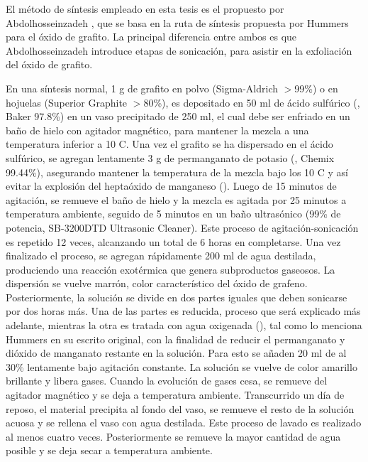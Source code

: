 El método de síntesis empleado en esta tesis es el propuesto por Abdolhosseinzadeh \citep{Abdolhosseinzadeh2015}, que se basa en la ruta de síntesis propuesta por Hummers para el óxido de grafito. La principal diferencia entre ambos es que Abdolhosseinzadeh introduce etapas de sonicación, para asistir en la exfoliación del óxido de grafito.

En una síntesis normal, 1 g de grafito en polvo (Sigma-Aldrich $>$99\%) o en hojuelas (Superior Graphite $>$80\%), es depositado en 50 ml de ácido sulfúrico (, Baker 97.8\%) en un vaso precipitado de 250 ml, el cual debe ser enfriado en un baño de hielo con agitador magnético, para mantener la mezcla a una temperatura inferior a 10 \degree C. Una vez el grafito se ha dispersado en el ácido sulfúrico, se agregan lentamente 3 g de permanganato de potasio (, Chemix 99.44\%), asegurando mantener la temperatura de la mezcla bajo los 10 C y así evitar la explosión del heptaóxido de manganeso ()\citep{Dreyer2010}. Luego de 15 minutos de agitación, se remueve el baño de hielo y la mezcla es agitada por 25 minutos a temperatura ambiente, seguido de 5 minutos en un baño ultrasónico (99\% de potencia, SB-3200DTD Ultrasonic Cleaner). Este proceso de agitación-sonicación es repetido 12 veces, alcanzando un total de 6 horas en completarse. Una vez finalizado el proceso, se agregan rápidamente 200 ml de agua destilada, produciendo una reacción exotérmica que genera subproductos gaseosos. La dispersión se vuelve marrón, color característico del óxido de grafeno. Posteriormente, la solución se divide en dos partes iguales que deben sonicarse por dos horas más. Una de las partes es reducida, proceso que será explicado más adelante, mientras la otra es tratada con agua oxigenada (), tal como lo menciona Hummers en su escrito original, con la finalidad de reducir el permanganato y dióxido de manganato restante en la solución. Para esto se añaden 20 ml de  al 30\% lentamente bajo agitación constante. La solución se vuelve de color amarillo brillante y libera gases. Cuando la evolución de gases cesa, se remueve del agitador magnético y se deja a temperatura ambiente. Transcurrido un día de reposo, el material precipita al fondo del vaso, se remueve el resto de la solución acuosa y se rellena el vaso con agua destilada. Este proceso de lavado es realizado al menos cuatro veces. Posteriormente se remueve la mayor cantidad de agua posible y se deja secar a temperatura ambiente.


